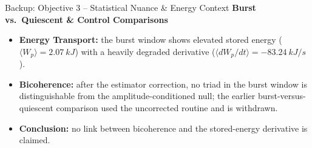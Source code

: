 \documentclass[aspectratio=169,xcolor=table]{beamer}
\begin{document}
\begin{frame}{Backup: Objective 3 -- Statistical Nuance \& Energy Context}
    \textbf{Burst vs.\ Quiescent \& Control Comparisons}
    \begin{itemize}
        \item \textbf{Energy Transport:} the burst window shows elevated stored
        energy ($\langle W_p\rangle=\SI{2.07}{kJ}$) with a heavily degraded
        derivative ($\langle dW_p/dt\rangle=\SI{-83.24}{kJ/s}$).
        \item \textbf{Bicoherence:} after the estimator correction, no triad in the burst window is distinguishable from the amplitude-conditioned null; the earlier burst-versus-quiescent comparison used the uncorrected routine and is withdrawn.
        \item \textbf{Conclusion:} no link between bicoherence and the stored-energy derivative is claimed.
    \end{itemize}
\end{frame}
\end{document}
